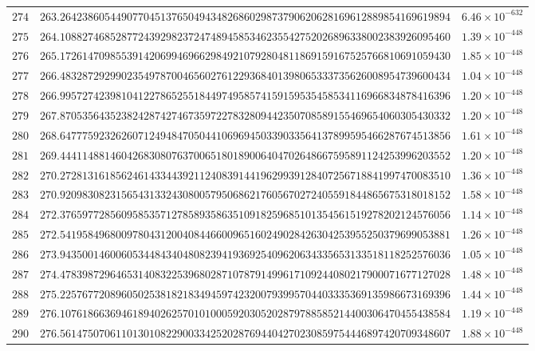 \documentclass[12pt,reqno]{amsart}
\theoremstyle{remark}
\begin{document}
\begin{longtable}{clc}
$274$ & $263.2642386054490770451376504943482686029873790620628169612889854169619894$ & $6.46\times 10^{-632}$ \\
$275$ & $264.1088274685287724392982372474894585346235542752026896338002383926095460$ & $1.39\times 10^{-448}$ \\
$276$ & $265.1726147098553914206994696629849210792804811869159167525766810691059430$ & $1.85\times 10^{-448}$ \\
$277$ & $266.4832872929902354978700465602761229368401398065333735626008954739600434$ & $1.04\times 10^{-448}$ \\
$278$ & $266.9957274239810412278652551844974958574159159535458534116966834878416396$ & $1.20\times 10^{-448}$ \\
$279$ & $267.8705356435238242874274673597227832809442350708589155469654060305430332$ & $1.20\times 10^{-448}$ \\
$280$ & $268.6477759232626071249484705044106969450339033564137899595466287674513856$ & $1.61\times 10^{-448}$ \\
$281$ & $269.4441148814604268308076370065180189006404702648667595891124253996203552$ & $1.20\times 10^{-448}$ \\
$282$ & $270.2728131618562461433443921124083914419629939128407256718841997470083510$ & $1.36\times 10^{-448}$ \\
$283$ & $270.9209830823156543133243080057950686217605670272405591844865675318018152$ & $1.58\times 10^{-448}$ \\
$284$ & $272.3765977285609585357127858935863510918259685101354561519278202124576056$ & $1.14\times 10^{-448}$ \\
$285$ & $272.5419584968009780431200408446600965160249028426304253955250379699053881$ & $1.26\times 10^{-448}$ \\
$286$ & $273.9435001460060534484340480823941936925409620634335653133518118252576036$ & $1.05\times 10^{-448}$ \\
$287$ & $274.4783987296465314083225396802871078791499617109244080217900071677127028$ & $1.48\times 10^{-448}$ \\
$288$ & $275.2257677208960502538182183494597423200793995704403335369135986673169396$ & $1.44\times 10^{-448}$ \\
$289$ & $276.1076186636946189402625701010005920305202879788585214400306470455438584$ & $1.19\times 10^{-448}$ \\
$290$ & $276.5614750706110130108229003342520287694404270230859754446897420709348607$ & $1.88\times 10^{-448}$ \\

\end{longtable}
\end{document}
